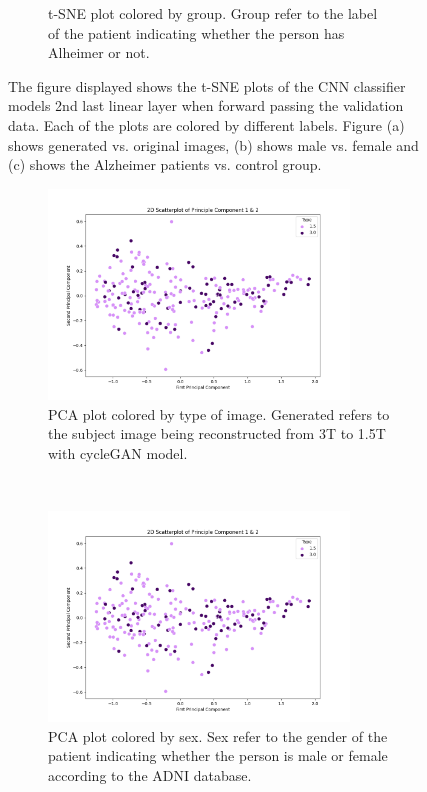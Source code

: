 \documentclass[12pt, fleqn, titlepage]{article}
\newcommand{\1}[1]{\mathds{1}\left[#1\right]}
\begin{document}
\begin{figure}[H]
\begin{subfigure}[t]{0.5\textwidth}
		\caption{t-SNE plot colored by group. Group refer to the label of the patient indicating whether the person has Alheimer or not.}
	\end{subfigure}
	\label{fig:type_1}
	\caption{The figure displayed shows the t-SNE plots of the CNN classifier models 2nd last linear layer when forward passing the validation data. Each of the plots are colored by different labels. Figure (a) shows generated vs. original images, (b) shows male vs. female and (c) shows the Alzheimer patients vs. control group. }
\end{figure}


\begin{figure}[H]
	\centering
	\begin{subfigure}[t]{0.59\textwidth}
		\centering
		\includegraphics[height=2.2in]{imgs/classifier/not_generated_imgs_pca_type}%
		\caption{PCA plot colored by type of image. Generated refers to the subject image being reconstructed from 3T to 1.5T with cycleGAN model.}
	\end{subfigure}%
	~
	\begin{subfigure}[t]{0.5\textwidth}
		\centering
		\includegraphics[height=2.2in]{imgs/classifier/not_generated_imgs_pca_sex}%
		\caption{PCA plot colored by sex. Sex refer to the gender of the patient indicating whether the person is male or female according to the ADNI database.}	
	\end{subfigure}
	\begin{subfigure}[t]{0.5\textwidth}

\end{subfigure}
\end{figure}
\end{document}

